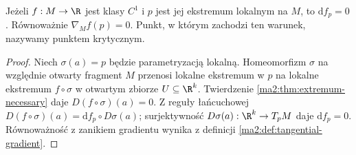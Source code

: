 \begin{twierdzenie}
\label{ma2:thm:manifold-critical}
Jeżeli $f:M\to\R$ jest klasy $C^1$ i $p$ jest jej
ekstremum lokalnym na $M$, to $\mathrm df_p=0$.
Równoważnie $\nabla_M f(p)=0$. Punkt, w którym zachodzi
ten warunek, nazywamy punktem krytycznym.
\end{twierdzenie}
\begin{proof}
Niech $\sigma(a)=p$ będzie parametryzacją lokalną.
Homeomorfizm $\sigma$ na względnie otwarty fragment $M$
przenosi lokalne ekstremum w $p$ na lokalne ekstremum
$f\circ\sigma$ w otwartym zbiorze $U\subseteq\R^k$.
Twierdzenie \ref{ma2:thm:extremum-necessary} daje
$D(f\circ\sigma)(a)=0$. Z reguły łańcuchowej
$D(f\circ\sigma)(a)=\mathrm df_p\circ D\sigma(a)$;
surjektywność $D\sigma(a):\R^k\to T_pM$ daje
$\mathrm df_p=0$. Równoważność z zanikiem gradientu
wynika z definicji \ref{ma2:def:tangential-gradient}.
\end{proof}

